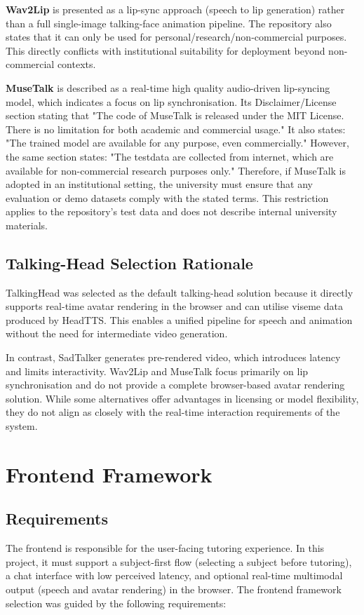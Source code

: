 \textbf{Wav2Lip} is presented as a lip-sync approach (speech to lip generation) rather than a full single-image talking-face animation pipeline. The repository also states that it can only be used for personal/research/non-commercial purposes. This directly conflicts with institutional suitability for deployment beyond non-commercial contexts. \parencite{GitHubRu28:online}

\textbf{MuseTalk} is described as a real-time high quality audio-driven lip-syncing model, which indicates a focus on lip synchronisation. Its Disclaimer/License section stating that "The code of MuseTalk is released under the MIT License. There is no limitation for both academic and commercial usage." It also states: "The trained model are available for any purpose, even commercially." However, the same section states: "The testdata are collected from internet, which are available for non-commercial research purposes only." Therefore, if MuseTalk is adopted in an institutional setting, the university must ensure that any evaluation or demo datasets comply with the stated terms. This restriction applies to the repository's test data and does not describe internal university materials. \parencite{GitHubTM58:online, TMElyral83:online}

\subsection{Talking-Head Selection Rationale}
TalkingHead was selected as the default talking-head solution because it directly supports real-time avatar rendering in the browser and can utilise viseme data produced by HeadTTS. This enables a unified pipeline for speech and animation without the need for intermediate video generation.

In contrast, SadTalker generates pre-rendered video, which introduces latency and limits interactivity. Wav2Lip and MuseTalk focus primarily on lip synchronisation and do not provide a complete browser-based avatar rendering solution. While some alternatives offer advantages in licensing or model flexibility, they do not align as closely with the real-time interaction requirements of the system.

\section{Frontend Framework}

\subsection{Requirements}
The frontend is responsible for the user-facing tutoring experience. In this project, it must support a subject-first flow (selecting a subject before tutoring), a chat interface with low perceived latency, and optional real-time multimodal output (speech and avatar rendering) in the browser. The frontend framework selection was guided by the following requirements:

